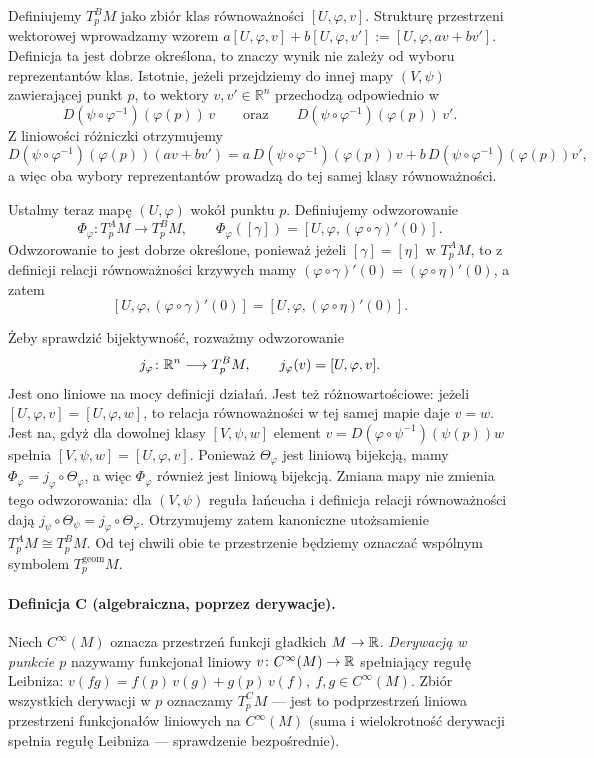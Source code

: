 Definiujemy $T_p^BM$ jako zbiór klas równoważności $[U,\varphi,v]$.
Strukturę przestrzeni wektorowej wprowadzamy wzorem $a[U,\varphi,v]+b[U,\varphi,v'] := [U,\varphi,av+bv']$.
Definicja ta jest dobrze określona, to znaczy wynik nie zależy od wyboru
reprezentantów klas. Istotnie, jeżeli przejdziemy do innej mapy
$(V,\psi)$ zawierającej punkt $p$, to wektory $v,v'\in\mathbb{R}^n$
przechodzą odpowiednio w
\[
D(\psi\circ\varphi^{-1})(\varphi(p))\,v
\qquad\text{oraz}\qquad
D(\psi\circ\varphi^{-1})(\varphi(p))\,v'.
\]
Z liniowości różniczki otrzymujemy
\[
D(\psi\circ\varphi^{-1})(\varphi(p))(av+bv')
=
a\,D(\psi\circ\varphi^{-1})(\varphi(p))v
+
b\,D(\psi\circ\varphi^{-1})(\varphi(p))v',
\]
a więc oba wybory reprezentantów prowadzą do tej samej klasy
równoważności.

Ustalmy teraz mapę $(U,\varphi)$ wokół punktu $p$. Definiujemy
odwzorowanie
\[
\Phi_\varphi\colon T_p^AM\longrightarrow T_p^BM,
\qquad
\Phi_\varphi([\gamma])
=
[U,\varphi,(\varphi\circ\gamma)'(0)].
\]
Odwzorowanie to jest dobrze określone, ponieważ jeżeli
$[\gamma]=[\eta]$ w $T_p^AM$, to z definicji relacji równoważności
krzywych mamy $(\varphi\circ\gamma)'(0) = (\varphi\circ\eta)'(0)$,
a zatem
\[
[U,\varphi,(\varphi\circ\gamma)'(0)]
=
[U,\varphi,(\varphi\circ\eta)'(0)].
\]

Żeby sprawdzić bijektywność, rozważmy odwzorowanie
\[
j_\varphi\colon\mathbb{R}^n\longrightarrow T_p^BM,
\qquad j_\varphi(v)=[U,\varphi,v].
\]
Jest ono liniowe na mocy definicji działań. Jest też
różnowartościowe: jeżeli $[U,\varphi,v]=[U,\varphi,w]$,
to relacja równoważności w tej samej mapie daje $v=w$.
Jest na, gdyż dla dowolnej klasy $[V,\psi,w]$ element $v=D(\varphi\circ\psi^{-1})(\psi(p))w$
spełnia $[V,\psi,w]=[U,\varphi,v]$. Ponieważ
$\Theta_\varphi$ jest liniową bijekcją, mamy
$\Phi_\varphi=j_\varphi\circ\Theta_\varphi$,
a więc $\Phi_\varphi$ również jest liniową bijekcją.
Zmiana mapy nie zmienia tego odwzorowania: dla $(V,\psi)$
reguła łańcucha i definicja relacji równoważności dają
$j_\psi\circ\Theta_\psi=j_\varphi\circ\Theta_\varphi$.
Otrzymujemy zatem kanoniczne utożsamienie $T_p^AM\cong T_p^BM$.
Od tej chwili obie te przestrzenie będziemy oznaczać wspólnym symbolem $T_p^{\mathrm{geom}}M$.

\paragraph*{Definicja C (algebraiczna, poprzez derywacje).} Niech $C^\infty(M)$ oznacza
przestrzeń funkcji gładkich $M\to\mathbb{R}$. \emph{Derywacją w punkcie $p$} nazywamy funkcjonał
liniowy $v\colon C^\infty(M)\to\mathbb{R}$ spełniający regułę Leibniza: $v(fg)=f(p)\,v(g)+g(p)\,v(f), \ f,g\in C^\infty(M)$.
Zbiór wszystkich derywacji w $p$ oznaczamy $T_p^CM$ — jest to podprzestrzeń liniowa
przestrzeni funkcjonałów liniowych na $C^\infty(M)$ (suma i wielokrotność derywacji
spełnia regułę Leibniza — sprawdzenie bezpośrednie).

